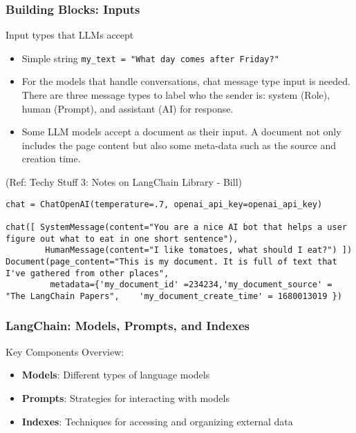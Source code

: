 \begin{frame}[fragile]\frametitle{Building Blocks: Inputs}

Input types that LLMs accept

\begin{itemize}
\item Simple string \lstinline|my_text = "What day comes after Friday?"|
\item For the models that handle conversations, chat message type input is needed. There are three message types to label who the sender is: system (Role), human (Prompt), and assistant (AI) for response.
\item Some LLM models accept a document as their input. A document not only includes the page content but also some meta-data such as the source and creation time.
\end{itemize}

{\tiny (Ref: Techy Stuff 3: Notes on LangChain Library - Bill)}

\begin{lstlisting}
chat = ChatOpenAI(temperature=.7, openai_api_key=openai_api_key)

chat([ SystemMessage(content="You are a nice AI bot that helps a user figure out what to eat in one short sentence"),
        HumanMessage(content="I like tomatoes, what should I eat?") ])
Document(page_content="This is my document. It is full of text that I've gathered from other places",
         metadata={'my_document_id' =234234,'my_document_source' = "The LangChain Papers",    'my_document_create_time' = 1680013019 })
\end{lstlisting}	  


\end{frame}


\begin{frame}[fragile]\frametitle{LangChain: Models, Prompts, and Indexes}

Key Components Overview:
\begin{itemize}
\item \textbf{Models}: Different types of language models
\item \textbf{Prompts}: Strategies for interacting with models
\item \textbf{Indexes}: Techniques for accessing and organizing external data
\end{itemize}

\end{frame}


